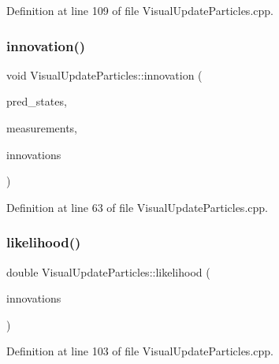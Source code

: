 Definition at line 109 of file Visual\+Update\+Particles.\+cpp.

\mbox{\label{classVisualUpdateParticles_ac6f27c465111a248314ce93ed630dd75}} 
\subsubsection{\texorpdfstring{innovation()}{innovation()}}
{\footnotesize\ttfamily void Visual\+Update\+Particles\+::innovation (\begin{DoxyParamCaption}\item[{const Eigen\+::\+Ref$<$ const Eigen\+::\+Matrix\+Xf $>$ \&}]{pred\+\_\+states,  }\item[{cv\+::\+Input\+Array}]{measurements,  }\item[{Eigen\+::\+Ref$<$ Eigen\+::\+Matrix\+Xf $>$}]{innovations }\end{DoxyParamCaption})\hspace{0.3cm}{\ttfamily [override]}}



Definition at line 63 of file Visual\+Update\+Particles.\+cpp.

\mbox{\label{classVisualUpdateParticles_ac8905544d7c082cca2fe52b773023bd7}} 
\subsubsection{\texorpdfstring{likelihood()}{likelihood()}}
{\footnotesize\ttfamily double Visual\+Update\+Particles\+::likelihood (\begin{DoxyParamCaption}\item[{const Eigen\+::\+Ref$<$ const Eigen\+::\+Matrix\+Xf $>$ \&}]{innovations }\end{DoxyParamCaption})\hspace{0.3cm}{\ttfamily [override]}}



Definition at line 103 of file Visual\+Update\+Particles.\+cpp.

\mbox{\label{classVisualUpdateParticles_adced067cb277d138db7f452db1bc01a6}} 
